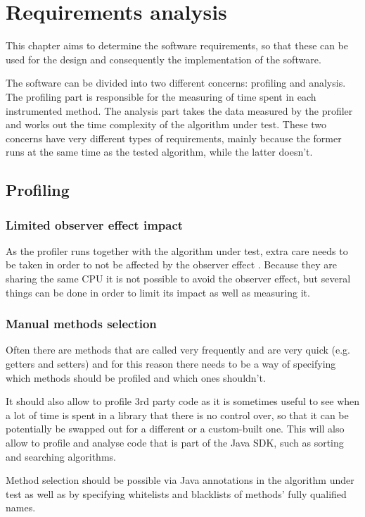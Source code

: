 \chapter{Requirements analysis}

This chapter aims to determine the software requirements, so that these can be used for the design and consequently the implementation of the software.

\noindent The software can be divided into two different concerns: profiling and analysis. The profiling part is responsible for the measuring of time spent in each instrumented method. The analysis part takes the data measured by the profiler and works out the time complexity of the algorithm under test. These two concerns have very different types of requirements, mainly because the former runs at the same time as the tested algorithm, while the latter doesn't.

\section{Profiling}

\subsection{Limited observer effect impact}
As the profiler runs together with the algorithm under test, extra care needs to be taken in order to not be affected by the observer effect \cite{MSH08}. Because they are sharing the same CPU it is not possible to avoid the observer effect, but several things can be done in order to limit its impact as well as measuring it.

\subsection{Manual methods selection}
Often there are methods that are called very frequently and are very quick (e.g. getters and setters) and for this reason there needs to be a way of specifying which methods should be profiled and which ones shouldn't.

\noindent It should also allow to profile 3rd party code as it is sometimes useful to see when a lot of time is spent in a library that there is no control over, so that it can be potentially be swapped out for a different or a custom-built one. This will also allow to profile and analyse code that is part of the Java SDK, such as sorting and searching algorithms.

\noindent Method selection should be possible via Java annotations in the algorithm under test as well as by specifying whitelists and blacklists of methods' fully qualified names.

